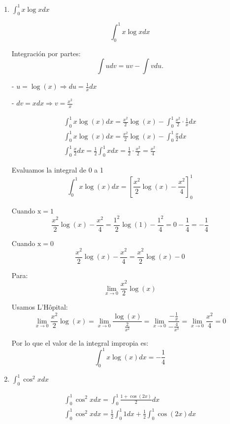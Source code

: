 \documentclass{article}
\begin{document}
\begin{enumerate}
\begin{enumerate}
Sabemos que $\arctan (0)=0$
$$
\int_0^b \frac{1}{1+x^2} d x=\arctan (b)
$$

Cuando $b \rightarrow \infty, \arctan (b) \rightarrow \frac{\pi}{2}$ por lo tanto:
$$
\lim _{b \rightarrow \infty} \arctan (b)=\frac{\pi}{2}
$$

Por lo tanto, la integral converge y su valor es:
$$
\int_0^{\infty} \frac{1}{1+x^2} d x=\frac{\pi}{2}
$$
        
		\item $ \int_{0}^{1}x\log x dx  $

$$
\int_0^1 x \log x d x
$$

Integración por partes:
$$
\int u d v=u v-\int v d u .
$$

- $u=\log (x) \Rightarrow d u=\frac{1}{x} d x$

- $d v=x d x \Rightarrow v=\frac{x^2}{x}$

$$
\begin{gathered}
\int_0^1 x \log (x) d x=\frac{x^2}{2} \log (x)-\int_0^1 \frac{x^2}{2} \cdot \frac{1}{x} d x \\
\int_0^1 x \log (x) d x=\frac{x^2}{2} \log (x)-\int_0^1 \frac{x}{2} d x \\
\int_0^1 \frac{x}{2} d x=\frac{1}{2} \int_0^1 x d x=\frac{1}{2} \cdot \frac{x^2}{2}=\frac{x^2}{4}
\end{gathered}
$$

Evaluamos la integral de 0 a 1
$$
\int_0^1 x \log (x) d x=\left[\frac{x^2}{2} \log (x)-\frac{x^2}{4}\right]_0^1
$$

Cuando $\mathrm{x}=1$
$$
\frac{x^2}{2} \log (x)-\frac{x^2}{4}=\frac{1^2}{2} \log (1)-\frac{1^2}{4}=0-\frac{1}{4}=-\frac{1}{4}
$$

Cuando $\mathrm{x}=0$
$$
\frac{x^2}{2} \log (x)-\frac{x^2}{4}=\frac{x^2}{2} \log (x)-0
$$

Para:
$$
\lim _{x \rightarrow 0} \frac{x^2}{2} \log (x)
$$

Usamos L'Hôpital:
$$
\lim _{x \rightarrow 0} \frac{x^2}{2} \log (x)=\lim _{x \rightarrow 0} \frac{\log (x)}{\frac{2}{x^2}}=\lim _{x \rightarrow 0} \frac{-\frac{1}{x}}{-\frac{4}{x^3}}=\lim _{x \rightarrow 0} \frac{x^2}{4}=0
$$

Por lo que el valor de la integral impropia es:
$$
\int_0^1 x \log (x) d x=-\frac{1}{4}
$$

        
		\item $ \int_{0}^{1} \cos^2x dx  $

$$
\begin{gathered}
\int_0^1 \cos ^2 x d x=\int_0^1 \frac{1+\cos (2 x)}{2} d x \\
\int_0^1 \cos ^2 x d x=\frac{1}{2} \int_0^1 1 d x+\frac{1}{2} \int_0^1 \cos (2 x) d x
\end{gathered}
$$


\end{enumerate}
\end{enumerate}
\end{document}
